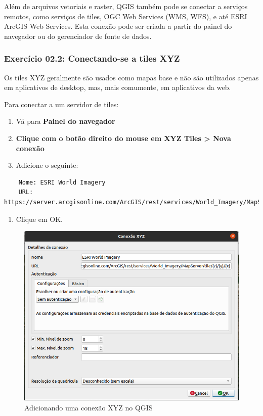 \documentclass[
  portuguese,
]{krantz}
\providecommand{\tightlist}{%
  \setlength{\itemsep}{0pt}\setlength{\parskip}{0pt}}
\begin{document}
Além de arquivos vetoriais e raster, QGIS também pode se conectar a serviços remotos, como serviços de tiles, OGC Web Services (WMS, WFS), e até ESRI ArcGIS Web Services. Esta conexão pode ser criada a partir do painel do navegador ou do gerenciador de fonte de dados.

\hypertarget{exercuxedcio-02.2-conectando-se-a-tiles-xyz}{%
\subsubsection{\texorpdfstring{\textbf{Exercício 02.2: Conectando-se a tiles XYZ}}{Exercício 02.2: Conectando-se a tiles XYZ}}\label{exercuxedcio-02.2-conectando-se-a-tiles-xyz}}

Os tiles XYZ geralmente são usados como mapas base e não são utilizados apenas em aplicativos de desktop, mas, mais comumente, em aplicativos da web.

Para conectar a um servidor de tiles:

\begin{enumerate}
\def\labelenumi{\arabic{enumi}.}
\tightlist
\item
  Vá para \textbf{Painel do navegador}
\item
  \textbf{Clique com o botão direito do mouse em XYZ Tiles \textgreater{} Nova conexão}
\item
  Adicione o seguinte:
\end{enumerate}

\begin{verbatim}
    Nome: ESRI World Imagery
    URL: https://server.arcgisonline.com/ArcGIS/rest/services/World_Imagery/MapServer/tile/{z}/{y}/{x}
\end{verbatim}

\begin{enumerate}
\def\labelenumi{\arabic{enumi}.}
\setcounter{enumi}{3}
\tightlist
\item
  Clique em OK.
\end{enumerate}

\begin{figure}
\centering
\includegraphics{media/modulo2/xyz-1.png}
\caption{Adicionando uma conexão XYZ no QGIS}
\end{figure}
\end{document}
